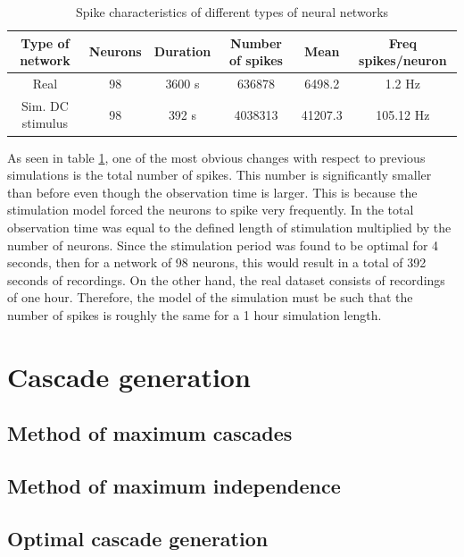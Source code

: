 \begin{table}[]
\centering
\begin{tabular}{|c|c|c|c|c|c|}
\hline
Type of network  & Neurons & Duration & Number of spikes & Mean    & Freq spikes/neuron \\ \hline
Real             & 98                & 3600 s           & 636878           & 6498.2  & 1.2 Hz               \\ \hline
Sim. DC stimulus & 98                & 392 s            & 4038313          & 41207.3 & 105.12 Hz            \\ \hline
\end{tabular}
\caption{Spike characteristics of different types of neural networks}
\label{tab:spike_characteristics}
\end{table}

As seen in table \ref{tab:spike_characteristics}, one of the most obvious changes with respect to previous simulations is the total number of spikes. This number is significantly smaller than before even though the observation time is larger. This is because the stimulation model forced the neurons to spike very frequently. In \cite{alexandru2018estimating} the total observation time was equal to the defined length of stimulation multiplied by the number of neurons. Since the stimulation period was found to be optimal for 4 seconds, then for a network of 98 neurons, this would result in a total of 392 seconds of recordings. 
On the other hand, the real dataset consists of recordings of one hour. Therefore, the model of the simulation must be such that the number of spikes is roughly the same for a 1 hour simulation length.





\section{Cascade generation}\label{simulating_cascade_generation}
\subsection{Method of maximum cascades}
\subsection{Method of maximum independence}
\subsection{Optimal cascade generation}
